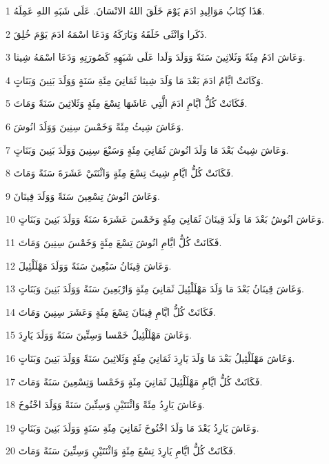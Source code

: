 \par 1 هَذَا كِتَابُ مَوَالِيدِ ادَمَ يَوْمَ خَلَقَ اللهُ الانْسَانَ. عَلَى شَبَهِ اللهِ عَمِلَهُ.
\par 2 ذَكَرا وَانْثَى خَلَقَهُ وَبَارَكَهُ وَدَعَا اسْمَهُ ادَمَ يَوْمَ خُلِقَ.
\par 3 وَعَاشَ ادَمُ مِئَةً وَثَلاثِينَ سَنَةً وَوَلَدَ وَلَدا عَلَى شَبَهِهِ كَصُورَتِهِ وَدَعَا اسْمَهُ شِيثا.
\par 4 وَكَانَتْ ايَّامُ ادَمَ بَعْدَ مَا وَلَدَ شِيثا ثَمَانِيَ مِئَةِ سَنَةٍ وَوَلَدَ بَنِينَ وَبَنَاتٍ.
\par 5 فَكَانَتْ كُلُّ ايَّامِ ادَمَ الَّتِي عَاشَهَا تِسْعَ مِئَةٍ وَثَلاثِينَ سَنَةً وَمَاتَ.
\par 6 وَعَاشَ شِيثُ مِئَةً وَخَمْسَ سِنِينَ وَوَلَدَ انُوشَ.
\par 7 وَعَاشَ شِيثُ بَعْدَ مَا وَلَدَ انُوشَ ثَمَانِيَ مِئَةٍ وَسَبْعَ سِنِينَ وَوَلَدَ بَنِينَ وَبَنَاتٍ.
\par 8 فَكَانَتْ كُلُّ ايَّامِ شِيثَ تِسْعَ مِئَةٍ وَاثْنَتَيْ عَشَرَةَ سَنَةً وَمَاتَ.
\par 9 وَعَاشَ انُوشُ تِسْعِينَ سَنَةً وَوَلَدَ قِينَانَ.
\par 10 وَعَاشَ انُوشُ بَعْدَ مَا وَلَدَ قِينَانَ ثَمَانِيَ مِئَةٍ وَخَمْسَ عَشَرَةَ سَنَةً وَوَلَدَ بَنِينَ وَبَنَاتٍ.
\par 11 فَكَانَتْ كُلُّ ايَّامِ انُوشَ تِسْعَ مِئَةٍ وَخَمْسَ سِنِينَ وَمَاتَ.
\par 12 وَعَاشَ قِينَانُ سَبْعِينَ سَنَةً وَوَلَدَ مَهْلَلْئِيلَ.
\par 13 وَعَاشَ قِينَانُ بَعْدَ مَا وَلَدَ مَهْلَلْئِيلَ ثَمَانِيَ مِئَةٍ وَارْبَعِينَ سَنَةً وَوَلَدَ بَنِينَ وَبَنَاتٍ.
\par 14 فَكَانَتْ كُلُّ ايَّامِ قِينَانَ تِسْعَ مِئَةٍ وَعَشَرَ سِنِينَ وَمَاتَ.
\par 15 وَعَاشَ مَهْلَلْئِيلُ خَمْسا وَسِتِّينَ سَنَةً وَوَلَدَ يَارِدَ.
\par 16 وَعَاشَ مَهْلَلْئِيلُ بَعْدَ مَا وَلَدَ يَارِدَ ثَمَانِيَ مِئَةٍ وَثَلاثِينَ سَنَةً وَوَلَدَ بَنِينَ وَبَنَاتٍ.
\par 17 فَكَانَتْ كُلُّ ايَّامِ مَهْلَلْئِيلَ ثَمَانِيَ مِئَةٍ وَخَمْسا وَتِسْعِينَ سَنَةً وَمَاتَ.
\par 18 وَعَاشَ يَارِدُ مِئَةً وَاثْنَتَيْنِ وَسِتِّينَ سَنَةً وَوَلَدَ اخْنُوخَ.
\par 19 وَعَاشَ يَارِدُ بَعْدَ مَا وَلَدَ اخْنُوخَ ثَمَانِيَ مِئَةِ سَنَةٍ وَوَلَدَ بَنِينَ وَبَنَاتٍ.
\par 20 فَكَانَتْ كُلُّ ايَّامِ يَارِدَ تِسْعَ مِئَةٍ وَاثْنَتَيْنِ وَسِتِّينَ سَنَةً وَمَاتَ.

